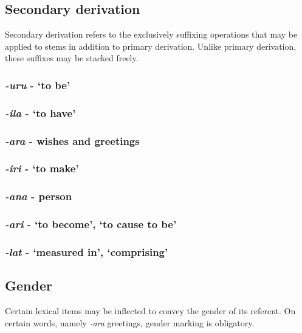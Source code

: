 \documentclass[a4paper,10pt,twoside,openright]{memoir}
\begin{document}
\subsection{Secondary derivation}

Secondary derivation refers to the exclusively suffixing operations that may be applied to stems in addition to primary derivation. Unlike primary derivation, these suffixes may be stacked freely. 

\subsubsection{\emph{-uru} - `to be'}

\subsubsection{\emph{-ila} - `to have'}

\subsubsection{\emph{-ara} - wishes and greetings}

\subsubsection{\emph{-iri} - `to make'}

\subsubsection{\emph{-ana} - person}

\subsubsection{\emph{-ari} - `to become', `to cause to be'}

\subsubsection{\emph{-lat} - `measured in', `comprising'}

\subsection{Gender}

Certain lexical items may be inflected to convey the gender of its referent. On certain words, namely \emph{-ara} greetings, gender marking is obligatory.
\end{document}
